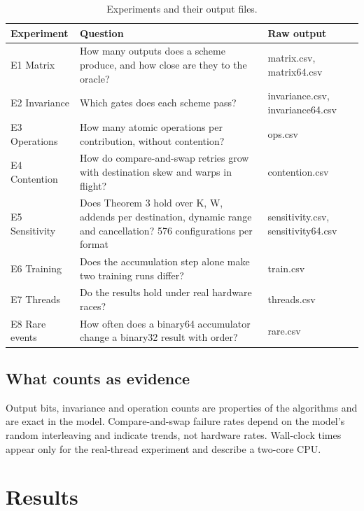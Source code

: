 \documentclass[journal]{IEEEtran}
\begin{document}
\begin{table}[!htbp]\centering\small\setlength{\tabcolsep}{4pt}
\caption{Experiments and their output files.}\label{tab:11}
\begin{tabularx}{\linewidth}{>{\raggedright\arraybackslash\hsize=0.517\hsize}X>{\raggedright\arraybackslash\hsize=1.310\hsize}X>{\raggedright\arraybackslash\hsize=1.172\hsize}X}
\toprule
Experiment & Question & Raw output \\
\midrule
E1 Matrix & How many outputs does a scheme produce, and how close are they to the
oracle? & matrix.csv, matrix64.csv \\
E2 Invariance & Which gates does each scheme pass? & invariance.csv, invariance64.csv \\
E3 Operations & How many atomic operations per contribution, without contention? & ops.csv \\
E4 Contention & How do compare-and-swap retries grow with destination skew and warps in
flight? & contention.csv \\
E5 Sensitivity & Does Theorem 3 hold over K, W, addends per destination, dynamic range
and cancellation? 576 configurations per format & sensitivity.csv, sensitivity64.csv \\
E6 Training & Does the accumulation step alone make two training runs differ? & train.csv \\
E7 Threads & Do the results hold under real hardware races? & threads.csv \\
E8 Rare events & How often does a binary64 accumulator change a binary32 result with
order? & rare.csv \\
\bottomrule
\end{tabularx}
\end{table}

\hypertarget{what-counts-as-evidence}{%
\subsection{What counts as evidence}\label{what-counts-as-evidence}}

Output bits, invariance and operation counts are properties of the
algorithms and are exact in the model. Compare-and-swap failure rates
depend on the model's random interleaving and indicate trends, not
hardware rates. Wall-clock times appear only for the real-thread
experiment and describe a two-core CPU.

\hypertarget{results}{%
\section{Results}\label{results}}
\end{document}
